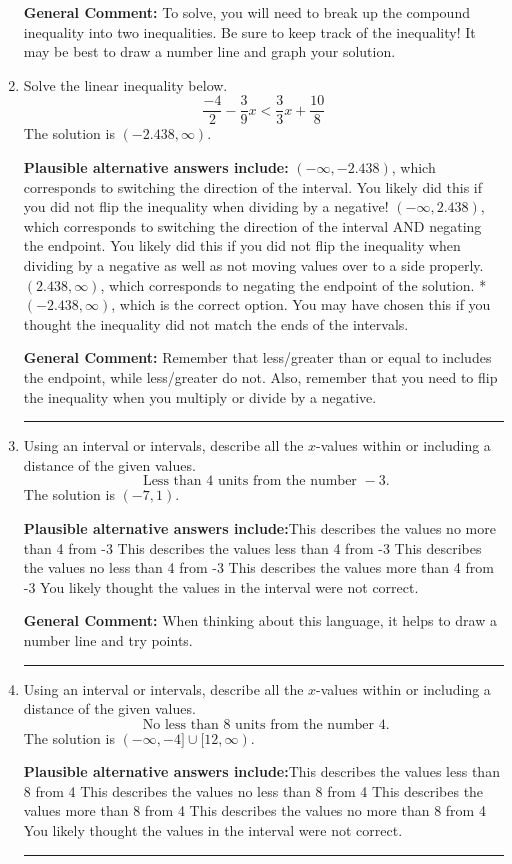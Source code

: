 \documentclass{extbook}[14pt]
\newcommand{\litem}[1]{\item #1

\rule{\textwidth}{0.4pt}}
\begin{document}
\begin{enumerate}
{\begin{enumerate}[label=\Alph*.]
\end{enumerate}

\textbf{General Comment:} To solve, you will need to break up the compound inequality into two inequalities. Be sure to keep track of the inequality! It may be best to draw a number line and graph your solution.
}
\litem{
Solve the linear inequality below.
\[ \frac{-4}{2} - \frac{3}{9} x < \frac{3}{3} x + \frac{10}{8} \]The solution is \( (-2.438, \infty) \).\begin{enumerate}[label=\Alph*.]
\textbf{Plausible alternative answers include:} $(-\infty, -2.438)$, which corresponds to switching the direction of the interval. You likely did this if you did not flip the inequality when dividing by a negative!
 $(-\infty, 2.438)$, which corresponds to switching the direction of the interval AND negating the endpoint. You likely did this if you did not flip the inequality when dividing by a negative as well as not moving values over to a side properly.
 $(2.438, \infty)$, which corresponds to negating the endpoint of the solution.
* $(-2.438, \infty)$, which is the correct option.
You may have chosen this if you thought the inequality did not match the ends of the intervals.
\end{enumerate}

\textbf{General Comment:} Remember that less/greater than or equal to includes the endpoint, while less/greater do not. Also, remember that you need to flip the inequality when you multiply or divide by a negative.
}
\litem{
Using an interval or intervals, describe all the $x$-values within or including a distance of the given values.
\[ \text{ Less than } 4 \text{ units from the number } -3. \]The solution is \( (-7, 1) \).\begin{enumerate}[label=\Alph*.]
\textbf{Plausible alternative answers include:}This describes the values no more than 4 from -3
This describes the values less than 4 from -3
This describes the values no less than 4 from -3
This describes the values more than 4 from -3
You likely thought the values in the interval were not correct.
\end{enumerate}

\textbf{General Comment:} When thinking about this language, it helps to draw a number line and try points.
}
\litem{
Using an interval or intervals, describe all the $x$-values within or including a distance of the given values.
\[ \text{ No less than } 8 \text{ units from the number } 4. \]The solution is \( (-\infty, -4] \cup [12, \infty) \).\begin{enumerate}[label=\Alph*.]
\textbf{Plausible alternative answers include:}This describes the values less than 8 from 4
This describes the values no less than 8 from 4
This describes the values more than 8 from 4
This describes the values no more than 8 from 4
You likely thought the values in the interval were not correct.
\end{enumerate}

}
\end{enumerate}
\end{document}
